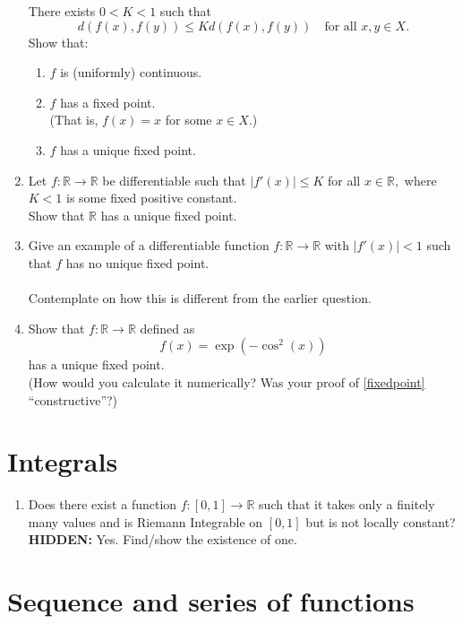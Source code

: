 \documentclass[12pt]{article}
\theoremstyle{definition}
\numberwithin{thm}{section}
\newcommand{\hint}[1]{\textbf{HIDDEN:} {\color[rgb]{0.95, 0.95, 0.95}#1}}
\begin{document}
\begin{enumerate}
	There exists $0 < K < 1$ such that
	\begin{equation*} 
		d(f(x), f(y)) \le Kd(f(x), f(y)) \quad \text{for all } x, y \in X.
	\end{equation*}
	Show that:
	\begin{enumerate}
		\item $f$ is (uniformly) continuous.
		\item \label{fixedpoint} $f$ has a fixed point.\\
		(That is, $f(x) = x$ for some $x \in X$.)
		\item $f$ has a unique fixed point.
	\end{enumerate}
	\item Let $f:\mathbb{R} \to \mathbb{R}$ be differentiable such that $|f'(x)| \le K$ for all $x \in \mathbb{R},$ where $K < 1$ is some fixed positive constant.\\
	Show that $\mathbb{R}$ has a unique fixed point.
	\item Give an example of a differentiable function $f:\mathbb{R} \to \mathbb{R}$ with $|f'(x)| < 1$ such that $f$ has no unique fixed point.\\~\\
	Contemplate on how this is different from the earlier question.
	\item Show that $f:\mathbb{R} \to \mathbb{R}$ defined as 
	\begin{equation*} 
		f(x) = \exp\left(-\cos^2(x)\right)
	\end{equation*}
	has a unique fixed point.\\
	(How would you calculate it numerically? Was your proof of \ref{fixedpoint} ``constructive''?)
\end{enumerate}
\newpage\section{Integrals}
\begin{enumerate}
	\item Does there exist a function $f:[0, 1] \to \mathbb{R}$ such that it takes only a finitely many values and is Riemann Integrable on $[0, 1]$ but is not locally constant?\\
	\hint{Yes. Find/show the existence of one.}
\end{enumerate}
\newpage\section{Sequence and series of functions}
\end{document}
